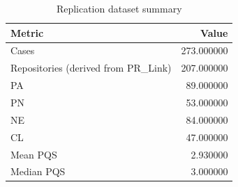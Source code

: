 \begin{table}
\caption{Replication dataset summary}
\label{tab:replication-summary}
\begin{tabular}{lr}
\toprule
Metric & Value \\
\midrule
Cases & 273.000000 \\
Repositories (derived from PR\_Link) & 207.000000 \\
PA & 89.000000 \\
PN & 53.000000 \\
NE & 84.000000 \\
CL & 47.000000 \\
Mean PQS & 2.930000 \\
Median PQS & 3.000000 \\
\bottomrule
\end{tabular}
\end{table}
